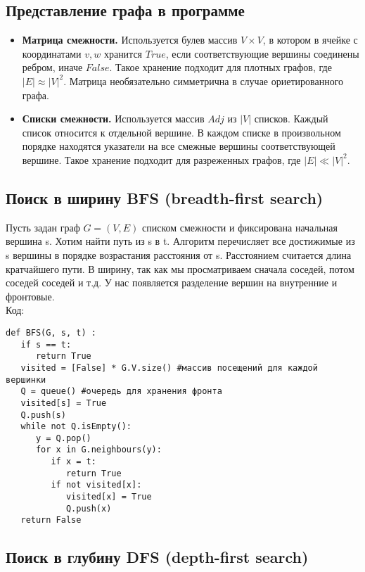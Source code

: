\subsection* {Представление графа в программе}
\begin{itemize}
\item  {\bf Матрица смежности.} Используется булев массив $V \times V$, в котором в ячейке с координатами $v, w$ хранится $True$, если соответствующие вершины соединены ребром, иначе $False$. Такое хранение подходит для плотных графов, где $|E| \approx |V|^2$. Матрица необязательно симметрична в случае ориетированного графа.
\item  {\bf Списки смежности.} Используется массив $Adj$ из $|V|$ списков. Каждый список относится к отдельной вершине. В каждом списке в произвольном порядке находятся указатели на все смежные вершины соответствующей вершине. Такое хранение подходит для разреженных графов, где $|E| \ll |V|^2$.
\end{itemize}

\subsection* {Поиск в ширину BFS (breadth-first search)}
Пусть задан граф $G = (V,E)$ списком смежности и фиксирована начальная вершина s. Хотим найти путь из s в t. Алгоритм перечисляет все достижимые из s вершины в порядке возрастания расстояния от s. Расстоянием считается длина кратчайшего пути. В ширину, так как мы просматриваем сначала соседей, потом соседей соседей и т.д. У нас появляется разделение вершин на внутренние и фронтовые.\\
Код:
\begin{verbatim}
def BFS(G, s, t) :
   if s == t:
      return True
   visited = [False] * G.V.size() #массив посещений для каждой вершинки
   Q = queue() #очередь для хранения фронта
   visited[s] = True
   Q.push(s)
   while not Q.isEmpty():
      y = Q.pop()
      for x in G.neighbours(y):
         if x = t:
            return True
         if not visited[x]:
            visited[x] = True
            Q.push(x)
   return False
\end{verbatim}

\subsection* {Поиск в глубину DFS (depth-first search)}

